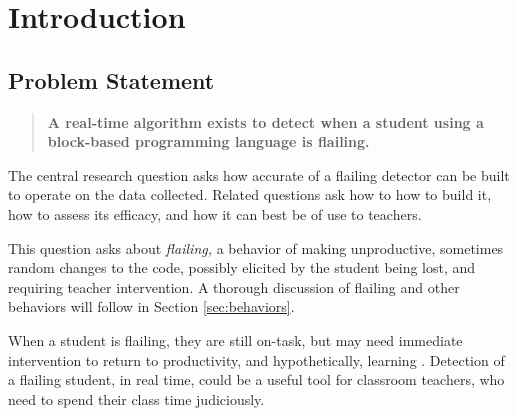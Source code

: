 \chapter{Introduction}

 
\section{Problem Statement} \label{sec:problem-statement}
\begin{quote}
\textbf{A real-time algorithm exists to detect when a student using a block-based programming language is flailing.}
\end{quote}

The central research question asks how accurate of a flailing detector can be built to operate on the data collected. Related questions ask how to how to build it, how to assess its efficacy, and how it can best be of use to teachers.

This question asks about \emph{flailing,} a behavior of making unproductive, sometimes random changes to the code, possibly elicited by the student being lost, and requiring teacher intervention. A thorough discussion of flailing and other behaviors will follow in Section \ref{sec:behaviors}.

When a student is flailing, they are still on-task, but may need immediate intervention to return to productivity, and hypothetically, learning \citep{baker2004off, perkins-1986}. Detection of a flailing student, in real time, could be a useful tool for classroom teachers, who need to spend their class time judiciously. 



